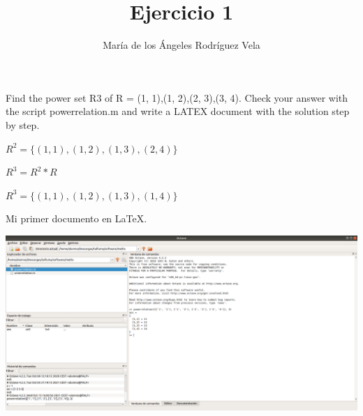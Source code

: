 \documentclass{article}
\title{Ejercicio 1}
\author{Mar\'ia de los \'Angeles Rodr\'iguez Vela}
\begin{document}
Find the power set R3
of R = {(1, 1),(1, 2),(2, 3),(3, 4)}. Check your answer with the script powerrelation.m and write a LATEX document with the
solution step by step.

$R^2 = \{(1,1),(1,2),(1,3),(2,4)\}$

$R^3 = R^2 * R$

$R^3 = \{(1,1),(1,2),(1,3),(1,4)\}$


\maketitle

Mi primer documento en \LaTeX{}.

\includegraphics[height=7 cm]{Ejer1.png}
\end{document}
